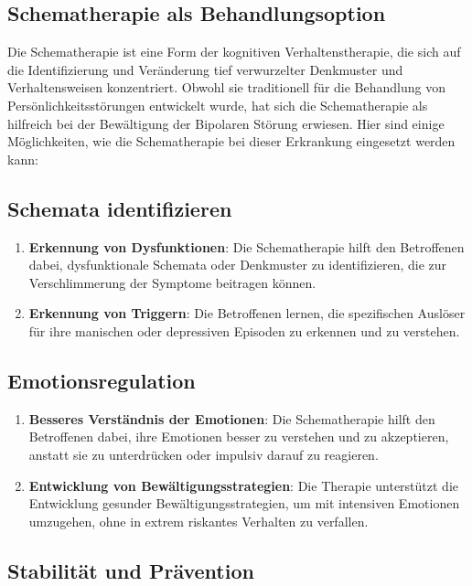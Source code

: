 \subsection{Schematherapie als Behandlungsoption}

Die Schematherapie ist eine Form der kognitiven Verhaltenstherapie, die sich auf die Identifizierung und Veränderung tief verwurzelter Denkmuster und Verhaltensweisen konzentriert. Obwohl sie traditionell für die Behandlung von Persönlichkeitsstörungen entwickelt wurde, hat sich die Schematherapie als hilfreich bei der Bewältigung der Bipolaren Störung erwiesen. Hier sind einige Möglichkeiten, wie die Schematherapie bei dieser Erkrankung eingesetzt werden kann:

\subsection{Schemata identifizieren}

\begin{enumerate}
\item \textbf{Erkennung von Dysfunktionen}: Die Schematherapie hilft den Betroffenen dabei, dysfunktionale Schemata oder Denkmuster zu identifizieren, die zur Verschlimmerung der Symptome beitragen können.

\item \textbf{Erkennung von Triggern}: Die Betroffenen lernen, die spezifischen Auslöser für ihre manischen oder depressiven Episoden zu erkennen und zu verstehen.
\end{enumerate}

\subsection{Emotionsregulation}

\begin{enumerate}
\item \textbf{Besseres Verständnis der Emotionen}: Die Schematherapie hilft den Betroffenen dabei, ihre Emotionen besser zu verstehen und zu akzeptieren, anstatt sie zu unterdrücken oder impulsiv darauf zu reagieren.

\item \textbf{Entwicklung von Bewältigungsstrategien}: Die Therapie unterstützt die Entwicklung gesunder Bewältigungsstrategien, um mit intensiven Emotionen umzugehen, ohne in extrem riskantes Verhalten zu verfallen.
\end{enumerate}

\subsection{Stabilität und Prävention}

